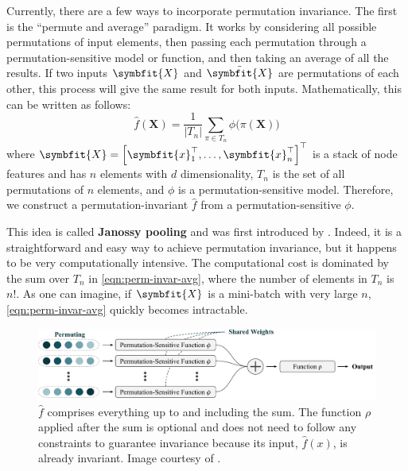 Currently, there are a few ways to incorporate permutation invariance. The first is the ``permute and average'' paradigm. It works by considering all possible permutations of input elements, then passing each permutation through a permutation-sensitive model or function, and then taking an average of all the results. If two inputs $\symbfit{X}$ and $\Tilde{\symbfit{X}}$ are permutations of each other, this process will give the same result for both inputs. Mathematically, this can be written as follows:
\begin{equation}
    \label{eqn:perm-invar-avg}
    \widehat{f}(\symbf{X}) = \frac{1}{|{T}_n|} \sum_{\pi \in {T}_n} \phi \bigl( \pi \left( \symbf{X} \right) \bigr)
\end{equation}
where $\symbfit{X}=\left[\symbfit{x}_1^\top, \ldots, \symbfit{x}_n^\top\right]^\top$ is a stack of node features and has $n$ elements with $d$ dimensionality, $T_n$ is the set of all permutations of $n$ elements, and $\phi$ is a permutation-sensitive model. Therefore, we construct a permutation-invariant $\widehat{f}$ from a permutation-sensitive $\phi$.

This idea is called \textbf{Janossy pooling} and was first introduced by \textcite{Murphy2018}. Indeed, it is a straightforward and easy way to achieve permutation invariance, but it happens to be very computationally intensive. The computational cost is dominated by the sum over $T_n$ in \cref{eqn:perm-invar-avg}, where the number of elements in $T_n$ is $n!$. As one can imagine, if $\symbfit{X}$ is a mini-batch with very large $n$, \cref{eqn:perm-invar-avg} quickly becomes intractable.

\begin{figure}[bh]
    \centering
    \includegraphics[width=\textwidth]{chapters/assets/graph-figs/permuting.pdf}
    \caption{$\widehat{f}$ comprises everything up to and including the sum. The function $\rho$ applied after the sum is optional and does not need to follow any constraints to guarantee invariance because its input, $\widehat{f}(x)$, is already invariant. Image courtesy of \textcite{wagstaff2022universal}.}
    \label{fig:basic-perm-invar}
\end{figure}

